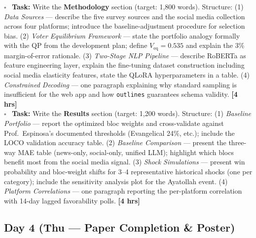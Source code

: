 \documentclass[11pt]{article}
\newcommand{\hrs}[1]{\textbf{[#1 hrs]}}
\newcommand{\veq}{V_{\mathrm{eq}}}
\newcommand{\dayhead}[2]{%
  \subsection*{Day #1 \normalfont\small\color{codegray}(#2)}}
\newcommand{\task}[2]{%
  \noindent\textbf{Task:} #1 \hfill \hrs{#2}\\}
\newcommand{\done}{\textcolor{sectionblue}{$\square$}\ }
\begin{document}
\begin{taskbox}
\done \task{Write the \textbf{Methodology} section (target: 1,800 words).
  Structure: (1) \textit{Data Sources} --- describe the five survey sources
  and the social media collection across four platforms; introduce the
  baseline-adjustment procedure for selection bias. (2) \textit{Voter
  Equilibrium Framework} --- state the portfolio analogy formally with the QP
  from the development plan; define $\veq = 0.535$ and explain the 3\%
  margin-of-error rationale. (3) \textit{Two-Stage NLP Pipeline} --- describe
  RoBERTa as feature engineering layer, explain the fine-tuning dataset
  construction including social media elasticity features, state the QLoRA
  hyperparameters in a table. (4) \textit{Constrained Decoding} --- one
  paragraph explaining why standard sampling is insufficient for the web app
  and how \texttt{outlines} guarantees schema validity.}{4}

\done \task{Write the \textbf{Results} section (target: 1,200 words).
  Structure: (1) \textit{Baseline Portfolio} --- report the optimized bloc
  weights and cross-validate against Prof.\ Espinosa's documented thresholds
  (Evangelical 24\%, etc.); include the LOCO validation accuracy table.
  (2) \textit{Baseline Comparison} --- present the three-way MAE table
  (news-only, social-only, unified LLM); highlight which blocs benefit most
  from the social media signal. (3) \textit{Shock Simulations} --- present
  win probability and bloc-weight shifts for 3--4 representative historical
  shocks (one per category); include the sensitivity analysis plot for the
  Ayatollah event. (4) \textit{Platform Correlations} --- one paragraph
  reporting the per-platform correlation with 14-day lagged favorability
  polls.}{4}
\end{taskbox}

\dayhead{4}{Thu --- Paper Completion \& Poster}
\end{document}
